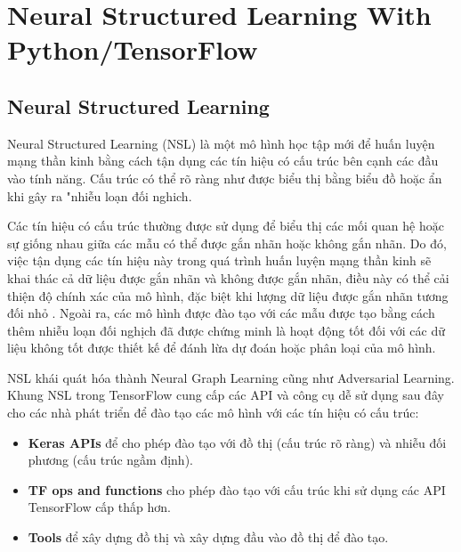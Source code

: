 
\chapter{Neural Structured Learning With Python/TensorFlow} %

\label{Chapter2} %

\newcommand{\keyword}[1]{\textbf{#1}}
\newcommand{\tabhead}[1]{\textbf{#1}}
\newcommand{\code}[1]{\texttt{#1}}
\newcommand{\file}[1]{\texttt{\bfseries#1}}
\newcommand{\option}[1]{\texttt{\itshape#1}}


\section{Neural Structured Learning}
Neural Structured Learning (NSL) là một mô hình học tập mới để huấn luyện mạng thần kinh bằng cách tận dụng các tín hiệu có cấu trúc bên cạnh các đầu vào tính 
năng. Cấu trúc có thể rõ ràng như được biểu thị bằng biểu đồ hoặc ẩn khi gây ra "nhiễu loạn đối nghich.

Các tín hiệu có cấu trúc thường được sử dụng để biểu thị các mối quan hệ hoặc sự giống nhau giữa các mẫu có thể được gắn nhãn hoặc không gắn nhãn. Do đó, việc 
tận dụng các tín hiệu này trong quá trình huấn luyện mạng thần kinh sẽ khai thác cả dữ liệu được gắn nhãn và không được gắn nhãn, điều này có thể cải thiện độ 
chính xác của mô hình, đặc biệt khi lượng dữ liệu được gắn nhãn tương đối nhỏ . Ngoài ra, các mô hình được đào tạo với các mẫu được tạo bằng cách thêm nhiễu loạn 
đối nghịch đã được chứng minh là hoạt động tốt đối với các dữ liệu không tốt được thiết kế để đánh lừa dự đoán hoặc phân loại của mô hình.

NSL khái quát hóa thành Neural Graph Learning cũng như Adversarial Learning. Khung NSL trong TensorFlow cung cấp các API và công cụ dễ sử dụng sau đây cho các 
nhà phát triển để đào tạo các mô hình với các tín hiệu có cấu trúc:
\begin{itemize}
    \item \textbf{Keras APIs} để cho phép đào tạo với đồ thị (cấu trúc rõ ràng) và nhiễu đối phương (cấu trúc ngầm định).
    \item \textbf{TF ops and functions} cho phép đào tạo với cấu trúc khi sử dụng các API TensorFlow cấp thấp hơn.
    \item \textbf{Tools} để xây dựng đồ thị và xây dựng đầu vào đồ thị để đào tạo.
\end{itemize}

